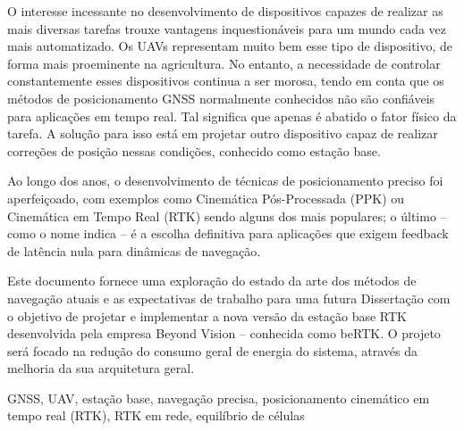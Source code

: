 O interesse incessante no desenvolvimento de dispositivos capazes de realizar as mais diversas tarefas trouxe vantagens inquestionáveis para um mundo cada vez mais automatizado. Os UAVs representam muito bem esse tipo de dispositivo, de forma mais proeminente na agricultura. No entanto, a necessidade de controlar constantemente esses dispositivos continua a ser morosa, tendo em conta que os métodos de posicionamento GNSS normalmente conhecidos não são confiáveis para aplicações em tempo real. Tal significa que apenas é abatido o fator físico da tarefa. A solução para isso está em projetar outro dispositivo capaz de realizar correções de posição nessas condições, conhecido como estação base.

Ao longo dos anos, o desenvolvimento de técnicas de posicionamento preciso foi aperfeiçoado, com exemplos como Cinemática Pós-Processada (PPK) ou Cinemática em Tempo Real (RTK) sendo alguns dos mais populares; o último -- como o nome indica -- é a escolha definitiva para aplicações que exigem feedback de latência nula para dinâmicas de navegação.

Este documento fornece uma exploração do estado da arte dos métodos de navegação atuais e as expectativas de trabalho para uma futura Dissertação com o objetivo de projetar e implementar a nova versão da estação base RTK desenvolvida pela empresa Beyond Vision -- conhecida como beRTK\textsuperscript{\textregistered}. O projeto será focado na redução do consumo geral de energia do sistema, através da melhoria da sua arquitetura geral.

\begin{keywords}
    GNSS, UAV, estação base, navegação precisa, posicionamento cinemático em tempo real (RTK), RTK em rede, equilíbrio de células
\end{keywords}
